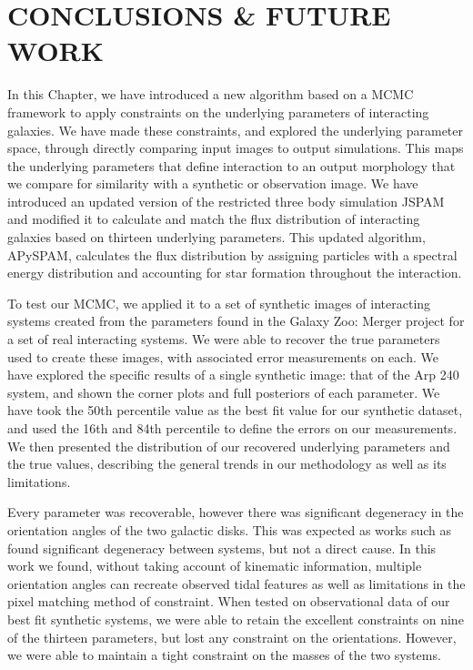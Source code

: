 \section{CONCLUSIONS \& FUTURE WORK}\label{Conclusions}
\noindent In this Chapter, we have introduced a new algorithm based on a MCMC framework to apply constraints on the underlying parameters of interacting galaxies. We have made these constraints, and explored the underlying parameter space, through directly comparing input images to output simulations. This maps the underlying parameters that define interaction to an output morphology that we compare for similarity with a synthetic or observation image. We have introduced an updated version of the restricted three body simulation JSPAM and modified it to calculate and match the flux distribution of interacting galaxies based on thirteen underlying parameters. This updated algorithm, APySPAM, calculates the flux distribution by assigning particles with a spectral energy distribution and accounting for star formation throughout the interaction. 

To test our MCMC, we applied it to a set of synthetic images of interacting systems created from the parameters found in the Galaxy Zoo: Merger project for a set of real interacting systems. We were able to recover the true parameters used to create these images, with associated error measurements on each. We have explored the specific results of a single synthetic image: that of the Arp 240 system, and shown the corner plots and full posteriors of each parameter. We have took the 50th percentile value as the best fit value for our synthetic dataset, and used the 16th and 84th percentile to define the errors on our measurements. We then presented the distribution of our recovered underlying parameters and the true values, describing the general trends in our methodology as well as its limitations. 

Every parameter was recoverable, however there was significant degeneracy in the orientation angles of the two galactic disks. This was expected as works such as \citet{2010ASPC..423..227S} found significant degeneracy between systems, but not a direct cause. In this work we found, without taking account of kinematic information, multiple orientation angles can recreate observed tidal features as well as limitations in the pixel matching method of constraint. When tested on observational data of our best fit synthetic systems, we were able to retain the excellent constraints on nine of the thirteen parameters, but lost any constraint on the orientations. However, we were able to maintain a tight constraint on the masses of the two systems. 

